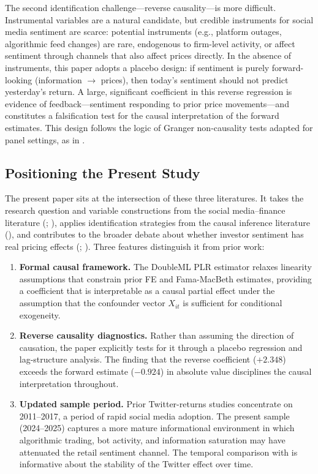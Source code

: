 The second identification challenge---reverse causality---is more difficult. Instrumental
variables are a natural candidate, but credible instruments for social media sentiment are scarce:
potential instruments (e.g., platform outages, algorithmic feed changes) are rare, endogenous to
firm-level activity, or affect sentiment through channels that also affect prices directly. In the
absence of instruments, this paper adopts a placebo design: if sentiment is purely forward-looking
(information $\to$ prices), then today's sentiment should not predict yesterday's return. A large,
significant coefficient in this reverse regression is evidence of feedback---sentiment responding
to prior price movements---and constitutes a falsification test for the causal interpretation of
the forward estimates. This design follows the logic of Granger non-causality tests adapted for
panel settings, as in \citet{holtz-eakin1988}.

\subsection{Positioning the Present Study}
\label{sec:lit_positioning}

The present paper sits at the intersection of these three literatures. It takes the research
question and variable constructions from the social media--finance literature (\citealt{gu2020};
\citealt{teti2019}), applies identification strategies from the causal inference literature
(\citealt{chernozhukov2018}), and contributes to the broader debate about whether investor
sentiment has real pricing effects (\citealt{baker2006}; \citealt{tetlock2007}). Three features
distinguish it from prior work:

\begin{enumerate}
    \item \textbf{Formal causal framework.} The DoubleML PLR estimator relaxes linearity
    assumptions that constrain prior FE and Fama-MacBeth estimates, providing a coefficient that
    is interpretable as a causal partial effect under the assumption that the confounder vector
    $X_{it}$ is sufficient for conditional exogeneity.

    \item \textbf{Reverse causality diagnostics.} Rather than assuming the direction of causation,
    the paper explicitly tests for it through a placebo regression and lag-structure analysis.
    The finding that the reverse coefficient ($+2.348$) exceeds the forward estimate ($-0.924$)
    in absolute value disciplines the causal interpretation throughout.

    \item \textbf{Updated sample period.} Prior Twitter-returns studies concentrate on 2011--2017,
    a period of rapid social media adoption. The present sample (2024--2025) captures a more
    mature informational environment in which algorithmic trading, bot activity, and information
    saturation may have attenuated the retail sentiment channel. The temporal comparison with
    \citet{gu2020} is informative about the stability of the Twitter effect over time.
\end{enumerate}


